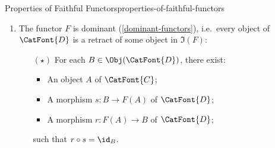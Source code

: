 \begin{proposition}{Properties of Faithful Functors}{properties-of-faithful-functors}
\begin{enumerate}
\begin{enumerate}
                \item\label{properties-of-faithful-functors-interaction-with-precomposition-3-g}The functor $F$ is dominant (\cref{dominant-functors}), i.e.\ every object of $\CatFont{D}$ is a retract of some object in $\Im(F)$:
                    \begin{itemize}%
                        \item[$(\star)$]For each $B\in\Obj(\CatFont{D})$, there exist:
                            \begin{itemize}%
                                \item An object $A$ of $\CatFont{C}$;
                                \item A morphism $s\colon B\to F(A)$ of $\CatFont{D}$;
                                \item A morphism $r\colon F(A)\to B$ of $\CatFont{D}$;
                            \end{itemize}%
                            such that $r\circ s=\id_{B}$.
                    \end{itemize}%
            \end{enumerate}
    \end{enumerate}
\end{proposition}
